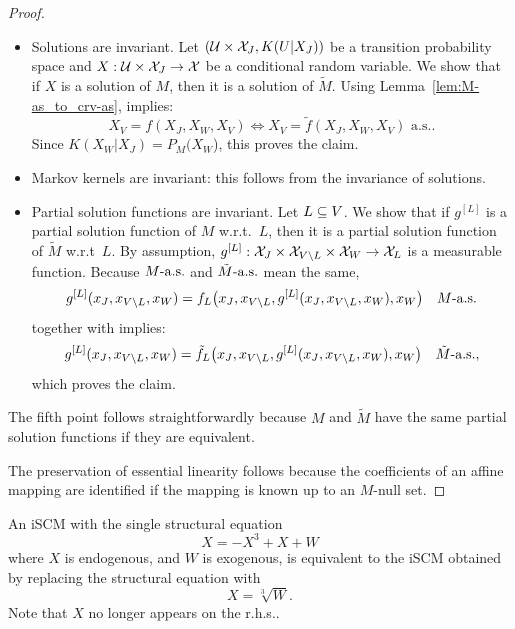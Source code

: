 \begin{proof}
\begin{itemize}
        \item
      Solutions are invariant.
          Let $(\mathcal{U} \times \mathcal{X}_{J}, K(U|X_J))$ be a transition probability space and $X : \mathcal{U} \times \mathcal{X}_{J} \to \mathcal{X}$ be a conditional random variable.
          We show that if $X$ is a solution of $M$, then it is a solution of $\tilde{M}$.
          Using Lemma~\ref{lem:M-as_to_crv-as},  implies:
          $$X_V = f(X_J,X_W,X_V) \iff X_V = \tilde{f}(X_J,X_W,X_V) \text{ a.s.}.$$
          Since $K(X_W|X_J) = P_M(X_W$), this proves the claim.

        \item
    Markov kernels are invariant: this follows from the invariance of solutions.

  \item
    Partial solution functions are invariant.
      Let $L \subseteq V$.
      We show that if $g^{[L]}$ is a partial solution function of $M$ w.r.t.\ $L$, then it is a partial solution function of $\tilde{M}$ w.r.t\ $L$.
      By assumption, $g^{[L]} : \mathcal{X}_{J} \times \mathcal{X}_{V\setminus L} \times \mathcal{X}_{W} \to \mathcal{X}_L$ is a measurable function.
      Because $M\text{-a.s.}$ and $\tilde{M}\text{-a.s.}$ mean the same, 
        $$g^{[L]}(x_{J},x_{V\setminus L},x_{W}) = f_L\big(x_{J}, x_{V\setminus L}, g^{[L]}(x_{J},x_{V\setminus L},x_{W}), x_{W}\big) \quad M\text{-a.s.}$$
      together with  implies:
        $$g^{[L]}(x_{J},x_{V\setminus L},x_{W}) = \tilde{f}_L\big(x_{J}, x_{V\setminus L}, g^{[L]}(x_{J},x_{V\setminus L},x_{W}), x_{W}\big) \quad \tilde{M}\text{-a.s.},$$
        which proves the claim.
  \end{itemize}

  The fifth point follows straightforwardly because $M$ and $\tilde{M}$ have the same partial solution functions if they are equivalent.

  The preservation of essential linearity follows because the coefficients of an affine mapping are identified if the mapping is known up to an $M$-null set.
\end{proof}

\begin{Eg}\label{eg:equivalent_scm}
  An iSCM with the single structural equation
  $$X = -X^3 + X + W$$
  where $X$ is endogenous, and $W$ is exogenous, is equivalent to the iSCM obtained by replacing the structural equation with
  $$X = \sqrt[3]{W}.$$
  Note that $X$ no longer appears on the r.h.s..
\end{Eg}


